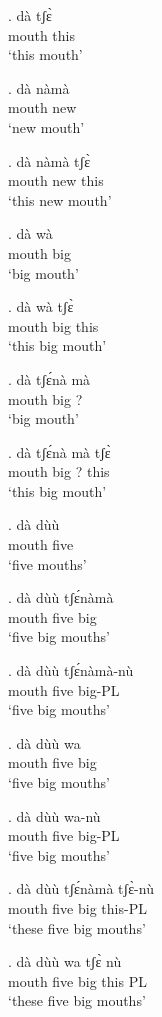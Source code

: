 \documentclass{assets/fieldnotes}
\begin{document}
\exg.
dà      tʃɛ̀  \\
mouth   this \\%
`this mouth'

\exg.
dà      nàmà \\
mouth   new  \\%
`new mouth'

\exg.
dà      nàmà   tʃɛ̀  \\
mouth   new    this \\%
`this new mouth'

\exg.
dà      wà  \\
mouth   big \\%
`big mouth'

\exg.
dà      wà    tʃɛ̀  \\
mouth   big   this \\%
`this big mouth'

\exg.
dà      tʃɛ́nà   mà \\
mouth   big     ?  \\%
`big mouth'

\exg.
dà      tʃɛ́nà   mà   tʃɛ̀  \\
mouth   big     ?    this \\%
`this big mouth'

\exg.
dà      dùù  \\
mouth   five \\%
`five mouths'

\exg.
dà      dùù    tʃɛ́nàmà \\
mouth   five   big     \\%
`five big mouths'

\exg.
dà      dùù    tʃɛ́nàmà-nù \\
mouth   five   big-PL     \\%
`five big mouths'

\exg.
dà      dùù    wa  \\
mouth   five   big \\%
`five big mouths'

\exg.
dà      dùù    wa-nù  \\
mouth   five   big-PL \\%
`five big mouths'

\exg.
dà      dùù    tʃɛ́nàmà   tʃɛ̀-nù  \\
mouth   five   big       this-PL \\%
`these five big mouths'

\exg.
dà      dùù    wa    tʃɛ̀    nù \\
mouth   five   big   this   PL \\%
`these five big mouths'
\end{document}
